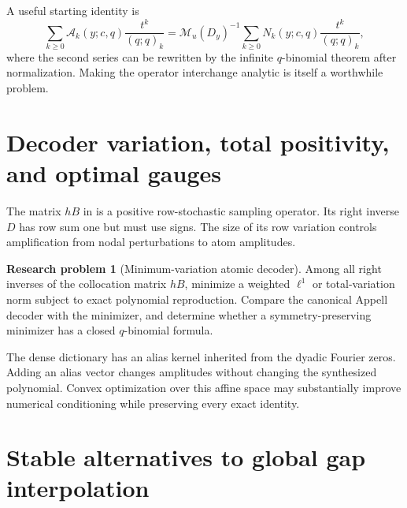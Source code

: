 \documentclass[11pt,oneside]{book}
\numberwithin{equation}{chapter}
\theoremstyle{definition}
\newtheorem{problem}[theorem]{Research problem}
\theoremstyle{remark}
\newcommand{\MGF}{\mathcal M}
\begin{document}
A useful starting identity is
\begin{equation}
 \sum_{k\ge0}\mathscr A_k(y;c,q)\frac{t^k}{(q;q)_k}
 =\MGF_u(D_y)^{-1}
  \sum_{k\ge0}N_k(y;c,q)\frac{t^k}{(q;q)_k},
 \label{eq:q-Appell-formal-generating}
\end{equation}
where the second series can be rewritten by the infinite $q$-binomial
theorem after normalization.  Making the operator interchange analytic is
itself a worthwhile problem.

\section{Decoder variation, total positivity, and optimal gauges}

The matrix $hB$ in  is a positive
row-stochastic sampling operator.  Its right inverse $D$ has row sum one but
must use signs.  The size of its row variation controls amplification from
nodal perturbations to atom amplitudes.

\begin{problem}[Minimum-variation atomic decoder]
\label{prob:minimum-variation-decoder}
Among all right inverses of the collocation matrix $hB$, minimize a weighted
$\ell^1$ or total-variation norm subject to exact polynomial reproduction.
Compare the canonical Appell decoder with the minimizer, and determine
whether a symmetry-preserving minimizer has a closed $q$-binomial formula.
\end{problem}

The dense dictionary has an alias kernel inherited from the dyadic Fourier
zeros.  Adding an alias vector changes amplitudes without changing the
synthesized polynomial.  Convex optimization over this affine space may
substantially improve numerical conditioning while preserving every exact
identity.

\section{Stable alternatives to global gap interpolation}
\end{document}
